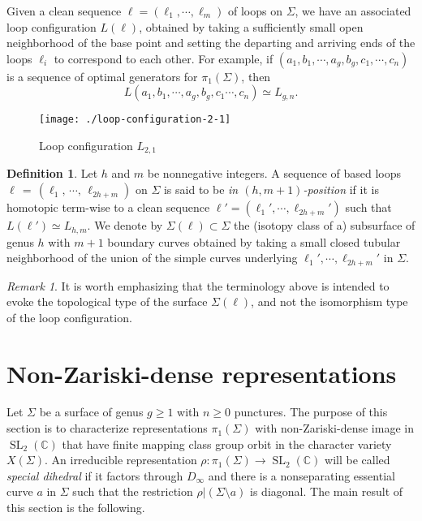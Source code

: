 \documentclass[reqno]{amsart}
\theoremstyle{plain}
\theoremstyle{definition}
\newtheorem{definition}[theorem]{Definition}
\theoremstyle{remark}
\newtheorem*{remark}{Remark}
\newcommand{\C}{{\mathbb{C}}}
\DeclareMathOperator{\SL}{SL}
\begin{document}
Given a clean sequence $\ell=(\ell_1,\cdots,\ell_m)$ of loops on $\Sigma$, we have an associated loop configuration $L(\ell)$, obtained by taking a sufficiently small open neighborhood of the base point and setting the departing and arriving ends of the loops $\ell_i$ to correspond to each other. For example, if $(a_1,b_1,\cdots,a_g,b_g,c_1,\cdots,c_n)$ is a sequence of optimal generators for $\pi_1(\Sigma)$, then
$$L(a_1,b_1,\cdots,a_g,b_g,c_1\cdots,c_n)\simeq L_{g,n}.$$

\begin{figure}[ht]
    \centering
    \texttt{[image: ./loop-configuration-2-1]}
    \caption{Loop configuration $L_{2,1}$}
    \label{fig4}
\end{figure}

\begin{definition}
Let $h$ and $m$ be nonnegative integers. A sequence of based loops $\ell\,=\,(\ell_1,\,\cdots,\,\ell_{2h+m})$ on $\Sigma$ is said to be \emph{in $(h,m+1)$-position} if it is homotopic term-wise to a clean sequence $\ell'=(\ell_1',\cdots,\ell_{2h+m}')$ such that $L(\ell')\simeq L_{h,m}$. We denote by $\Sigma(\ell)\subset \Sigma$ the (isotopy class of a) subsurface of genus $h$ with $m+1$ boundary curves obtained by taking a small closed tubular neighborhood of the union of the simple curves underlying $\ell_1',\cdots,\ell_{2h+m}'$ in $\Sigma$.
\end{definition}

\begin{remark}
It is worth emphasizing that the terminology above is intended to evoke the topological type of the surface $\Sigma(\ell)$, and not the isomorphism type of the loop configuration.
\end{remark}

\section{Non-Zariski-dense representations} \label{sect:3}
Let $\Sigma$ be a surface of genus $g\geq1$ with $n\geq0$ punctures. The purpose of this section is to characterize representations $\pi_1(\Sigma)$ with non-Zariski-dense image in $\SL_2(\C)$ that have finite mapping class group orbit in the character variety $X(\Sigma)$. An irreducible representation $\rho:\pi_1(\Sigma)\to \SL_2(\C)$ will be called \emph{special dihedral} if it factors through $D_\infty$ and there is a nonseparating essential curve $a$ in $\Sigma$ such that the restriction $\rho|(\Sigma\setminus a)$ is diagonal.
The main result of this section is the following.
\end{document}
